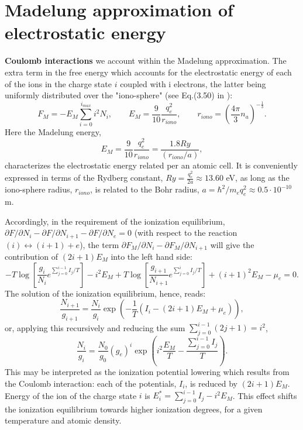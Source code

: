 \section{Madelung approximation of electrostatic energy}
{\bf Coulomb interactions} we account within the Madelung approximation. The extra term in the free energy which accounts for the
electrostatic energy of each of the ions in the charge state $i$ coupled with i electrons, the latter being uniformly
distributed over the "iono-sphere"
(see Eq.(3.50) in \cite{drake}):
\begin{equation}\label{fterm}
F_M=-E_M \sum_{i=0}^{i_{max}} i^2 N_i,\qquad E_M=\frac{9}{10} \frac{q_e^2}{r_{iono}},\qquad
r_{iono} = \left( \frac{4 \pi}{3} n_a \right)^{-\frac13}.
\end{equation}
Here the Madelung energy,
\begin{equation}
E_M=\frac9{10}\frac{q_e^2}{r_{iono}}=\frac{1.8Ry}{(r_{iono}/a)},
\end{equation}
characterizes the electrostatic energy related per an atomic cell. It is conveniently expressed in terms of the Rydberg constant,  $Ry=\frac{q_e^2}{2a}\approx 13.60$ eV, as long as
the iono-sphere radius, $r_{iono}$, is related to the Bohr radius, $a=\hbar^2/m_e q_e^2\approx0.5\cdot10^{-10}$ m.

Accordingly, in the requirement of the ionization equilibrium, $\partial F/\partial N_i - \partial F/\partial N_{i+1} - \partial F/\partial N_e = 0$ (with respect to the reaction $(i)\leftrightarrow(i+1)+e$),
the term $\partial F_{M}/\partial N_i -\partial F_{M}/\partial N_{i+1}$ will 
give the contribution of $(2i+1) E_M$ into the left hand side:
\begin{equation}
-T \log \left[ \frac{g_i}    {N_i}     e^{\sum_{j=0}^{i-1} I_j/T} \right] - i^2 E_M
+T \log \left[ \frac{g_{i+1}}{N_{i+1}} e^{\sum_{j=0}^i     I_j/T} \right] + (i+1)^2 E_M
-\mu_e = 0.
\end{equation}
The solution of the ionization equilibrium, hence, reads:
\begin{equation}
\frac{N_{i+1}}{g_{i+1}} = \frac{N_i}{g_i} \exp\left(-\frac1T \left(I_i - (2i+1) E_M + \mu_e \right)\right),
\end{equation}
or, applying this recursively and reducing the sum $\sum_{j=0}^{i-1} (2j+1) = i^2$,
\begin{equation}\label{pfM}
\frac{N_i}{g_i}=\frac{N_0}{g_0}(g_e)^i \exp \left( i^2 \frac{E_M}{T} -\frac{\sum_{j=0}^{i-1}I_j}T \right) .
\end{equation}
This may be interpreted as the ionization potential lowering which results from the Coulomb interaction:
each of the potentials, $I_i$, is reduced by $(2i+1)E_M$.
Energy of the ion of the charge state $i$ is $E_i^* = \sum_{j=0}^{i-1}I_j - i^2 E_M$.
This effect shifts the ionization equilibrium towards higher ionization degrees, for a given temperature and atomic density.

